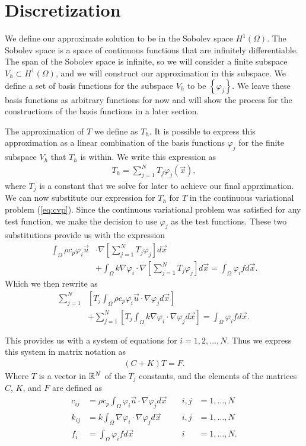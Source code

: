\documentclass[../fem.tex]{subfiles}
\begin{document}
\section{Discretization}%
\label{sec:discretization}

We define our approximate solution to be in the Sobolev space $H^1(\Omega)$. The
Sobolev space is a space of continuous functions that are infinitely
differentiable. The span of the Sobolev space is infinite, so we will consider a
finite subspace $V_h\subset H^1(\Omega)$, and we will construct our
approximation in this subspace. We define a set of basis functions for the
subspace $V_h$ to be $\left\{\varphi_j\right\}$. We leave these basis functions
as arbitrary functions for now and will show the process for the
constructions of the basis functions in a later section.

The approximation of $T$ we define as $T_h$. It is possible to express this
approximation as a linear combination of the basis functions $\varphi_j$ for the
finite subspace $V_h$ that $T_h$ is within. We write this expression as
\begin{align}\label{eq:lin_approx}
  T_h=\sum_{j=1}^NT_j\varphi_j(\vec{x}),
\end{align}
where $T_j$ is a constant that we solve for later to achieve our final
apprximation. We can now substitute our expression for $T_h$ for $T$ in the
continuous variational problem (\ref{eq:cvp}). Since the continuous variational
problem was satisfied for any test function, we make the decision to use
$\varphi_j$ as the test functions. These two substitutions provide us with the
expression
\begin{align*}
  \int_\Omega\rho c_p \varphi_i\vec{u}&\cdot\nabla\left[\sum_{j=1}^NT_j\varphi_j\right]d\vec{x}\\
  &+\int_\Omega k\nabla
  \varphi_i\cdot\nabla\left[\sum_{j=1}^NT_j\varphi_j\right]d\vec{x}
  =\int_\Omega \varphi_ifd\vec{x}.
\end{align*}
Which we then rewrite as
\begin{align*}
  \sum_{j=1}^N&\left[T_j\int_\Omega\rho c_p\varphi_i\vec{u}\cdot\nabla\varphi_jd\vec{x}\right]\\
  &+ \sum_{j=1}^N\left[T_j\int_\Omega
  k\nabla\varphi_i\cdot\nabla\varphi_jd\vec{x}\right]=\int_\Omega\varphi_ifd\vec{x}.
\end{align*}

This provides us with a system of equations for $i=1,2,\ldots,N$. Thus we
express this system in matrix notation as
\begin{align}\label{eq:mat_rep}
  (C+K)T=F.
\end{align}
Where $T$ is a vector in $\mathbb{R}^N$ of the $T_j$ constants, and the elements of the
matrices $C$, $K$, and $F$ are defined as
\begin{align*}
  c_{ij}&=\rho c_p\int_\Omega\varphi_i\vec{u}\cdot\nabla\varphi_jd\vec{x}\quad
        &i,j&=1,\ldots,N\\
  k_{ij}&=k\int_\Omega\nabla\varphi_i\cdot\nabla\varphi_jd\vec{x}\quad
        &i,j&=1,\ldots,N\\
  f_i&=\int_\Omega\varphi_ifd\vec{x}\quad&i&=1,\ldots,N.
\end{align*}
\end{document}
